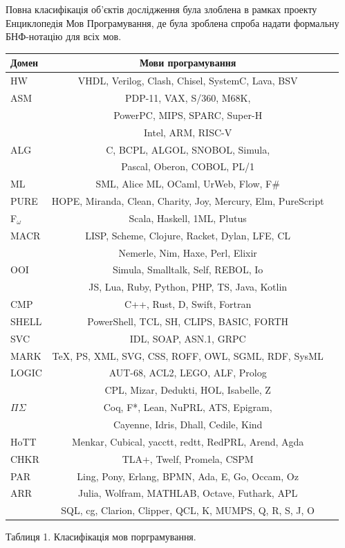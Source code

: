 Повна класифікація об'єктів дослідження була злоблена в рамках проекту
Енциклопедія Мов Програмування, де була зроблена спроба надати
формальну БНФ-нотацію для всіх мов.
\begin{table}[!ht]
 \begin{tabular}{lcc}
    \hline
       \textbf{Домен} & \textbf{Мови програмування} \\
    \hline
       HW & VHDL, Verilog, Clash, Chisel, SystemC, Lava, BSV \\
    \hline
       ASM & PDP-11, VAX, S/360, M68K,  \\
           & PowerPC, MIPS, SPARC, Super-H \\
           & Intel, ARM, RISC-V \\
    \hline
       ALG & C, BCPL, ALGOL, SNOBOL, Simula, \\
           & Pascal, Oberon, COBOL, PL/1 \\
    \hline
       ML & SML, Alice ML, OCaml, UrWeb, Flow, F\# \\
    \hline
       PURE & HOPE, Miranda, Clean, Charity, Joy, Mercury, Elm, PureScript \\
    \hline
       F$_\omega$ & Scala, Haskell, 1ML, Plutus \\
    \hline
       MACR & LISP, Scheme, Clojure, Racket, Dylan, LFE, CL \\
            & Nemerle, Nim, Haxe, Perl, Elixir \\
    \hline
       OOI & Simula, Smalltalk, Self, REBOL, Io \\
           & JS, Lua, Ruby, Python, PHP, TS, Java, Kotlin \\
    \hline
       CMP & C++, Rust, D, Swift, Fortran \\
    \hline
       SHELL & PowerShell, TCL, SH, CLIPS, BASIC, FORTH \\
    \hline
       SVC & IDL, SOAP, ASN.1, GRPC \\
    \hline
       MARK & TeX, PS, XML, SVG, CSS, ROFF, OWL, SGML, RDF, SysML \\
    \hline
       LOGIC & AUT-68, ACL2, LEGO, ALF, Prolog \\
             & CPL, Mizar, Dedukti, HOL, Isabelle, Z \\
    \hline
       $\Pi\Sigma$ & Coq, F*, Lean, NuPRL, ATS, Epigram, \\
          & Cayenne, Idris, Dhall, Cedile, Kind \\
    \hline
       HoTT & Menkar, Cubical, yacctt, redtt, RedPRL, Arend, Agda \\
    \hline
       CHKR & TLA+, Twelf, Promela, CSPM \\
    \hline
       PAR & Ling, Pony, Erlang, BPMN, Ada, E, Go, Occam, Oz \\
    \hline
       ARR & Julia, Wolfram, MATHLAB, Octave, Futhark, APL \\
           & SQL, cg, Clarion, Clipper, QCL, K, MUMPS, Q, R, S, J, O \\
    \hline
  \end{tabular}
\small Таблиця 1. Класифікація мов порграмування.
\end{table}

\normalsize
